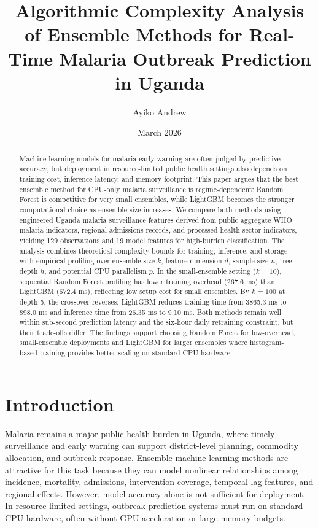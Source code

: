 \documentclass[11pt]{article}
\title{Algorithmic Complexity Analysis of Ensemble Methods for Real-Time Malaria Outbreak Prediction in Uganda}
\author{Ayiko Andrew}
\date{March 2026}
\begin{document}
\maketitle

\begin{abstract}
Machine learning models for malaria early warning are often judged by predictive accuracy, but deployment in resource-limited public health settings also depends on training cost, inference latency, and memory footprint. This paper argues that the best ensemble method for CPU-only malaria surveillance is regime-dependent: Random Forest is competitive for very small ensembles, while LightGBM becomes the stronger computational choice as ensemble size increases. We compare both methods using engineered Uganda malaria surveillance features derived from public aggregate WHO malaria indicators, regional admissions records, and processed health-sector indicators, yielding 129 observations and 19 model features for high-burden classification. The analysis combines theoretical complexity bounds for training, inference, and storage with empirical profiling over ensemble size $k$, feature dimension $d$, sample size $n$, tree depth $h$, and potential CPU parallelism $p$. In the small-ensemble setting ($k=10$), sequential Random Forest profiling has lower training overhead (267.6 ms) than LightGBM (672.4 ms), reflecting low setup cost for small ensembles. By $k=100$ at depth 5, the crossover reverses: LightGBM reduces training time from 3865.3 ms to 898.0 ms and inference time from 26.35 ms to 9.10 ms. Both methods remain well within sub-second prediction latency and the six-hour daily retraining constraint, but their trade-offs differ. The findings support choosing Random Forest for low-overhead, small-ensemble deployments and LightGBM for larger ensembles where histogram-based training provides better scaling on standard CPU hardware.
\end{abstract}

\section{Introduction}
Malaria remains a major public health burden in Uganda, where timely surveillance and early warning can support district-level planning, commodity allocation, and outbreak response. Ensemble machine learning methods are attractive for this task because they can model nonlinear relationships among incidence, mortality, admissions, intervention coverage, temporal lag features, and regional effects. However, model accuracy alone is not sufficient for deployment. In resource-limited settings, outbreak prediction systems must run on standard CPU hardware, often without GPU acceleration or large memory budgets.
\end{document}
